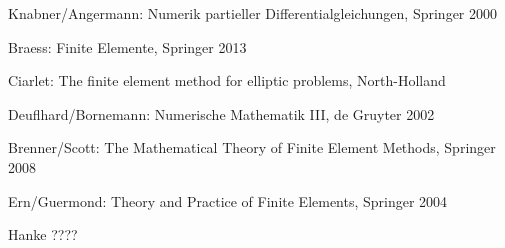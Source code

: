 Knabner/Angermann: Numerik partieller Differentialgleichungen, Springer 2000

Braess: Finite Elemente, Springer 2013

Ciarlet: The finite element method for elliptic problems, North-Holland

Deuflhard/Bornemann: Numerische Mathematik III, de Gruyter 2002

Brenner/Scott: The Mathematical Theory of Finite Element Methods, Springer 2008

Ern/Guermond: Theory and Practice of Finite Elements, Springer 2004

Hanke ????

\clearpage

\pagestyle{plain}

\setcounter{page}{1}
